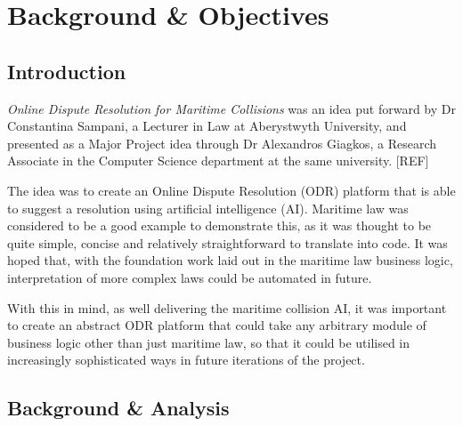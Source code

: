 \chapter{Background \& Objectives}


\section{Introduction} %

\emph{Online Dispute Resolution for Maritime Collisions} was an idea put forward by Dr Constantina Sampani, a Lecturer in Law at Aberystwyth University, and presented as a Major Project idea through Dr Alexandros Giagkos, a Research Associate in the Computer Science department at the same university. [REF] %

The idea was to create an Online Dispute Resolution (ODR) platform that is able to suggest a resolution using artificial intelligence (AI). Maritime law was considered to be a good example to demonstrate this, as it was thought to be quite simple, concise and relatively straightforward to translate into code. It was hoped that, with the foundation work laid out in the maritime law business logic, interpretation of more complex laws could be automated in future.

With this in mind, as well delivering the maritime collision AI, it was important to create an abstract ODR platform that could take any arbitrary module of business logic other than just maritime law, so that it could be utilised in increasingly sophisticated ways in future iterations of the project.

\section{Background \& Analysis} %

